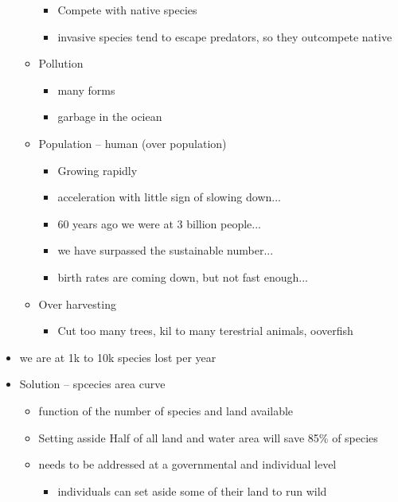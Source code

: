 \documentclass{article}
\theoremstyle{definition}
\begin{document}
\begin{itemize}
\begin{itemize}
\begin{itemize}
					\item Compete with native species
					\item invasive species tend to escape predators, so they outcompete native
				\end{itemize}
			\item Pollution
				\begin{itemize}
					\item  many forms
					\item garbage in the ociean
				\end{itemize}
			\item Population -- human (over population)
				\begin{itemize}
					\item Growing rapidly
					\item acceleration with little sign of slowing down...
					\item 60 years ago we were at 3 billion people...
					\item we have surpassed the sustainable number...
					\item birth rates are coming down, but not fast enough...
				\end{itemize}
			\item Over harvesting
				\begin{itemize}
					\item Cut too many trees, kil to many terestrial animals, ooverfish
				\end{itemize}
		\end{itemize}
	\item we are at 1k to 10k species lost per year
	\item Solution -- spcecies area curve
		\begin{itemize}
			\item function of the number of species and land available
			\item Setting asside Half of all land and water area will save 85\% of species
			\item needs to be addressed at a governmental and individual level
				\begin{itemize}
					\item individuals can set aside some of their land to run wild
				\end{itemize}
		\end{itemize}
\end{itemize}

							
\end{document}
